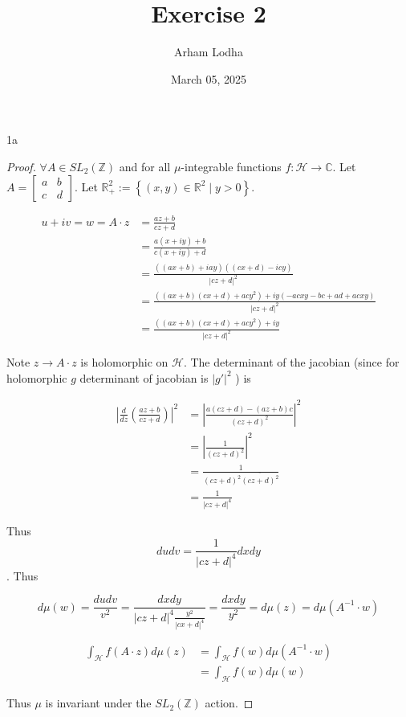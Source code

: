 \documentclass{article}
\newcommand*{\HC}{\mathcal{H}}
\newcommand{\C}{\mathbb{C}}
\newcommand{\R}{\mathbb{R}}
\newcommand{\Z}{\mathbb{Z}}
\newcommand{\abs}[1]{\left\lvert #1\right\rvert}
\begin{document}
\title{Exercise 2}
\author{Arham Lodha}%
\date{March 05, 2025}%
\maketitle

\begin{PROB}{1a}\label{Problem 1a.}
\end{PROB}
\begin{proof}
    $\forall A \in SL_2(\Z)$ and for all $\mu$-integrable functions  $f:\HC \to \C$. Let $A = \begin{bmatrix}
        a & b \\ c & d
    \end{bmatrix}$. 
    Let $\R^2_+ := \left\{ (x, y) \in \R^2 \mid y > 0 \right\}$.
    
    \begin{align*}
        u + iv = w = A \cdot z &= \frac{az + b}{cz + d} \\
        &= \frac{a(x + iy) + b}{c(x + iy) + d} \\
        &= \frac{((ax + b) + iay)((cx + d) - icy)}{\abs{cz + d}^2} \\
        &= \frac{((ax + b)(cx + d) + acy^2) + iy(-acxy - bc + ad + acxy)}{\abs{cz + d}^2} \\
        &= \frac{((ax + b)(cx + d) + acy^2) + iy}{\abs{cz + d}^2}
    \end{align*}

    Note $z \to A \cdot z$ is holomorphic on $\HC$. The determinant of the jacobian (since for holomorphic $g$ determinant of jacobian is $\abs{g'}^2$   ) is 
    
    \begin{align*}
        \abs{\frac{d}{dz}\left(\frac{az + b}{cz + d}\right)}^2 &= \abs{\frac{a(cz + d) - (az + b)c}{(cz + d)^2}}^2 \\
        &= \abs{\frac{1}{(cz + d)^2}}^2 \\
        &= \frac{1}{(cz + d)^2\overline{(cz + d)^2}} \\
        &= \frac{1}{\abs{cz + d}^4} 
    \end{align*}

    Thus \[du dv = \frac{1}{\abs{cz + d}^4} dx dy\]. Thus 
    
    \[d \mu(w) = \frac{du dv}{v^2} = \frac{ dx dy}{\abs{cz + d}^4 \frac{y^2}{\abs{cx + d}^4}} = \frac{dx dy}{y^2} = d \mu(z) = d \mu(A^{-1} \cdot w)\]   


    \begin{align*}
        \int_{\HC} f(A \cdot z) d\mu(z) &= \int_{\HC} f(w)  d\mu(A^{-1} \cdot w) \\
        &= \int_{\HC} f(w) d \mu(w)
    \end{align*}

    Thus $\mu$ is invariant under the $SL_2(\Z)$ action.    
\end{proof}
\end{document}
